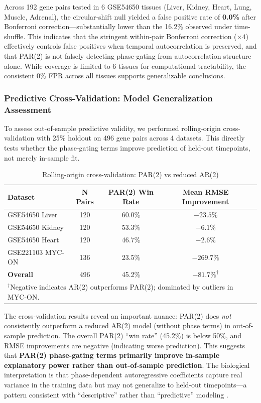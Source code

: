 \documentclass[11pt,a4paper]{article}
\begin{document}
Across 192 gene pairs tested in 6 GSE54650 tissues (Liver, Kidney, Heart, Lung, Muscle, Adrenal), the circular-shift null yielded a false positive rate of \textbf{0.0\%} after Bonferroni correction---substantially lower than the 16.2\% observed under time-shuffle. This indicates that the stringent within-pair Bonferroni correction ($\times 4$) effectively controls false positives when temporal autocorrelation is preserved, and that PAR(2) is not falsely detecting phase-gating from autocorrelation structure alone. While coverage is limited to 6 tissues for computational tractability, the consistent 0\% FPR across all tissues supports generalizable conclusions.

\subsubsection{Predictive Cross-Validation: Model Generalization Assessment}

To assess out-of-sample predictive validity, we performed rolling-origin cross-validation with 25\% holdout on 496 gene pairs across 4 datasets. This directly tests whether the phase-gating terms improve prediction of held-out timepoints, not merely in-sample fit.

\begin{table}[H]
\centering
\caption{Rolling-origin cross-validation: PAR(2) vs reduced AR(2)}
\label{tab:cv_results}
\begin{tabular}{lcccc}
\toprule
Dataset & N Pairs & PAR(2) Win Rate & Mean RMSE Improvement \\
\midrule
GSE54650 Liver & 120 & 60.0\% & $-23.5\%$ \\
GSE54650 Kidney & 120 & 53.3\% & $-6.1\%$ \\
GSE54650 Heart & 120 & 46.7\% & $-2.6\%$ \\
GSE221103 MYC-ON & 136 & 23.5\% & $-269.7\%$ \\
\midrule
\textbf{Overall} & 496 & 45.2\% & $-81.7\%^{\dagger}$ \\
\bottomrule
\multicolumn{4}{l}{\footnotesize $^{\dagger}$Negative indicates AR(2) outperforms PAR(2); dominated by outliers in MYC-ON.}
\end{tabular}
\end{table}

The cross-validation results reveal an important nuance: PAR(2) does \textit{not} consistently outperform a reduced AR(2) model (without phase terms) in out-of-sample prediction. The overall PAR(2) ``win rate'' (45.2\%) is below 50\%, and RMSE improvements are negative (indicating worse prediction). This suggests that \textbf{PAR(2) phase-gating terms primarily improve in-sample explanatory power rather than out-of-sample prediction}. The biological interpretation is that phase-dependent autoregressive coefficients capture real variance in the training data but may not generalize to held-out timepoints---a pattern consistent with ``descriptive'' rather than ``predictive'' modeling \citep{shmueli2010explain}.
\end{document}
